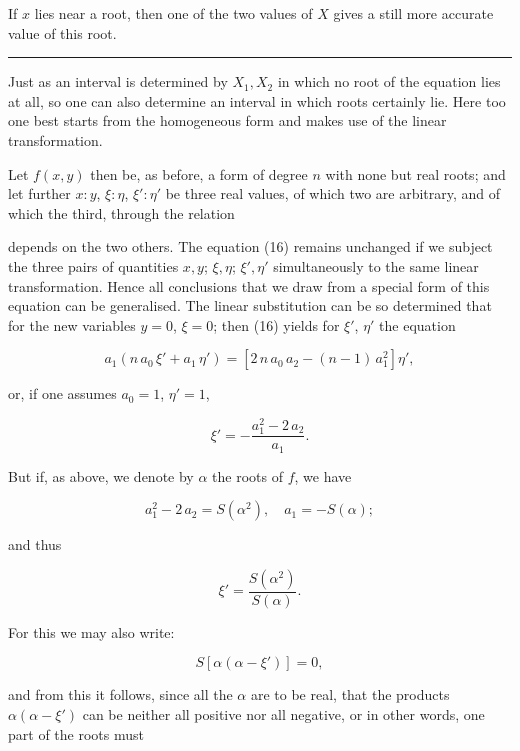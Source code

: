 
If $x$ lies near a root, then one of the two values
of $X$ gives a still more accurate value of this root.

\begin{center}
\rule{2cm}{0.4pt}
\end{center}

Just as an interval is determined by $X_1, X_2$ in which
no root of the equation lies at all, so one can also determine an
interval in which roots certainly lie. Here too
one best starts from the homogeneous form and makes use of
the linear transformation.

Let $f(x, y)$ then be, as before, a form of degree $n$ with none but
real roots; and let further $x:y$, $\xi:\eta$, $\xi':\eta'$ be three real
values, of which two are arbitrary, and of which the
third, through the relation


depends on the two others. The equation (16) remains
unchanged if we subject the three pairs of quantities $x, y$; $\xi, \eta$; $\xi', \eta'$
simultaneously to the same linear transformation. Hence
all conclusions that we draw from a special form of this
equation can be generalised. The linear substitution
can be so determined that for the new variables $y = 0$,
$\xi = 0$; then (16) yields for $\xi'$, $\eta'$ the equation

\[
a_1(n\,a_0\,\xi' + a_1\,\eta') = [2\,n\,a_0\,a_2 - (n-1)\,a_1^2]\eta',
\]

or, if one assumes $a_0 = 1$, $\eta' = 1$,

\[
\xi' = -\frac{a_1^2 - 2\,a_2}{a_1}.
\]

But if, as above, we denote by $\alpha$ the roots of $f$,
we have

\[
a_1^2 - 2\,a_2 = S(\alpha^2), \quad a_1 = -S(\alpha);
\]

and thus

\[
\xi' = \frac{S(\alpha^2)}{S(\alpha)}.
\]

For this we may also write:

\[
S[\alpha(\alpha - \xi')] = 0,
\]

and from this it follows, since all the $\alpha$ are to be real, that the
products $\alpha(\alpha - \xi')$ can be neither all positive nor all negative,
or in other words, one part of the roots must
